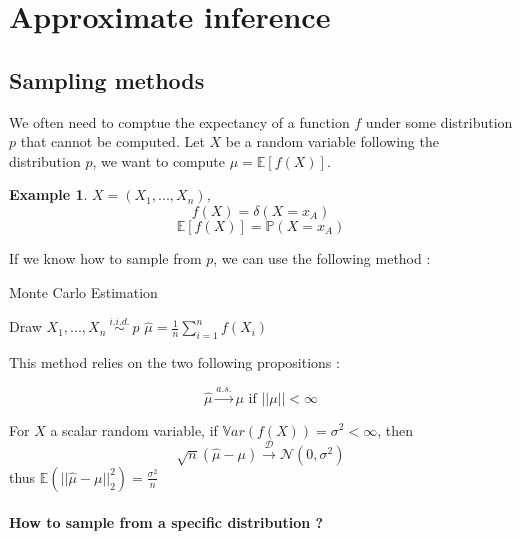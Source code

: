 \documentclass[12pt]{report}
\newcommand{\esp}{\mathbb{E}}
\newcommand{\var}{\mathbb{V}ar}
\newcommand{\p}{\mathbb{P}}
\newtheorem{example}{Example}[section]
\begin{document}
\section{Approximate inference}
\subsection{Sampling methods}

We often need to comptue the expectancy of a function $f$ under some distribution $p$ that cannot be computed. Let $X$ be a random variable following the distribution $p$, we want to compute $\mu = \esp[f(X)]$.

\begin{example}
$ X = (X_1, ..., X_n)$,
$$f(X) = \delta(X = x_A)$$
$$\esp[f(X)] = \p(X=x_A)$$
\end{example}

If we know how to sample from $p$, we can use the following method :

\FloatBarrier
\begin{algorithm}
\caption{Monte Carlo Estimation}\label{RS}
\begin{algorithmic}[1]
\State Draw $X_1, ..., X_n~\overset{i.i.d.}{\sim}~p$
\State $\hat{\mu} = \frac{1}{n}\sum_{i=1}^n f(X_i)$
\end{algorithmic}
\end{algorithm}
\FloatBarrier

This method relies on the two following propositions :

\begin{proposition}
\[
\hat{\mu} \overset{a.s.}{\longrightarrow} \mu \text{ if } ||\mu|| < \infty
\]
\end{proposition}

\begin{proposition}
For $X$ a scalar random variable, if $\var(f(X)) = \sigma^2 < \infty$, then
\[
  \sqrt{n}(\hat{\mu} - \mu) \overset{\mathcal{D}}{\longrightarrow} \mathcal{N}(0, \sigma^2)
\]
thus $\esp(||\hat{\mu} - \mu||^2_2) = \frac{\sigma^2}{n}$
\end{proposition}

\paragraph{How to sample from a specific distribution ?}
\end{document}
